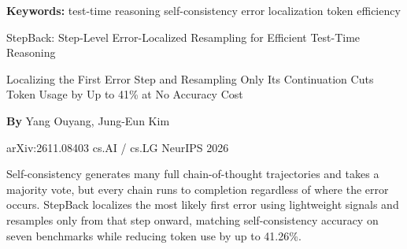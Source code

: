 \documentclass[10pt,twocolumn]{article}
\begin{document}
\setlength{\parindent}{0pt}
\setlength{\parskip}{4pt}

{\small\color{keywordgray}\textbf{Keywords:}
  test-time reasoning \textbullet{}
  self-consistency \textbullet{}
  error localization \textbullet{}
  token efficiency}\par\vspace{4pt}

{\LARGE\bfseries\raggedright
  StepBack: Step-Level Error-Localized Resampling for Efficient Test-Time Reasoning}\par\vspace{4pt}

{\large\itshape\raggedright
  Localizing the First Error Step and Resampling Only Its Continuation
  Cuts Token Usage by Up to 41\% at No Accuracy Cost}\par\vspace{6pt}

{\small\textbf{By} Yang Ouyang, Jung-Eun Kim}\par\vspace{2pt}

{\small\color{keywordgray}arXiv:2611.08403 \textbullet{}
  cs.AI / cs.LG \textbullet{} NeurIPS 2026}
\par\vspace{2pt}\noindent{\color{rulered}\rule{\columnwidth}{0.6pt}}\vspace{6pt}

Self-consistency generates many full chain-of-thought trajectories and
takes a majority vote, but every chain runs to completion regardless of
where the error occurs. StepBack localizes the most likely first error
using lightweight signals and resamples only from that step onward,
matching self-consistency accuracy on seven benchmarks while reducing
token use by up to 41.26\%.
\end{document}
